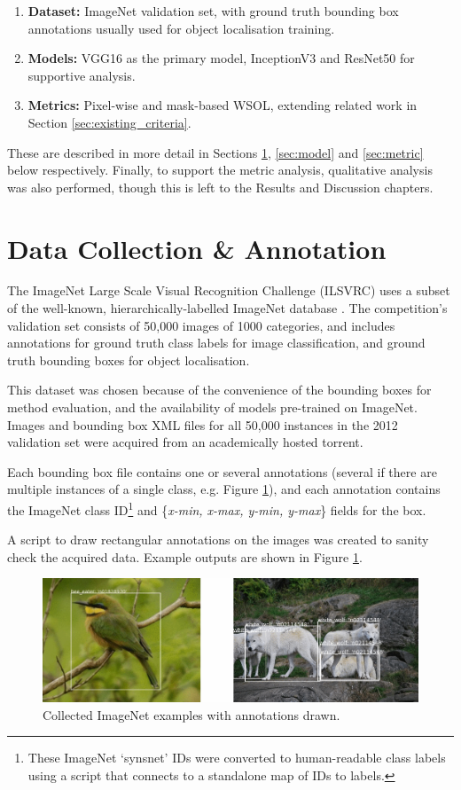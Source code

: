 \documentclass[main]{subfiles}
\begin{document}
\begin{enumerate}
\item \textbf{Dataset:} ImageNet validation set, with ground truth bounding box annotations usually used for object localisation training. 
\item \textbf{Models:} VGG16 as the primary model, InceptionV3 and ResNet50 for supportive analysis.
\item \textbf{Metrics:} Pixel-wise and mask-based WSOL, extending related work in Section \ref{sec:existing_criteria}.
\end{enumerate}

These are described in more detail in Sections \ref{sec:data}, \ref{sec:model} and \ref{sec:metric} below respectively. Finally, to support the metric analysis, qualitative analysis was also performed, though this is left to the Results and Discussion chapters.


\section{Data Collection \& Annotation} \label{sec:data}

The ImageNet Large Scale Visual Recognition Challenge (ILSVRC) uses a subset of the well-known, hierarchically-labelled ImageNet database \cite{ilsvrc}. The competition's validation set consists of 50,000 images of 1000 categories, and includes annotations for ground truth class labels for image classification, and ground truth bounding boxes for object localisation.

This dataset was chosen because of the convenience of the bounding boxes for method evaluation, and the availability of models pre-trained on ImageNet. Images and bounding box XML files for all 50,000 instances in the 2012 validation set were acquired from an academically hosted torrent.

Each bounding box file contains one or several annotations (several if there are multiple instances of a single class, e.g. Figure \ref{dataimg}), and each annotation contains the ImageNet class ID\footnote{These ImageNet `synsnet' IDs were converted to human-readable class labels using a script that connects to a standalone map of IDs to labels.} and \{\textit{x-min, x-max, y-min, y-max}\} fields for the box. 

A script to draw rectangular annotations on the images was created to sanity check the acquired data. Example outputs are shown in Figure \ref{dataimg}.

\begin{figure}[h]
\centering
\includegraphics[scale=0.45]{annotation.png}
\caption{Collected ImageNet examples with annotations drawn.}
\label{dataimg}
\end{figure}
\end{document}
